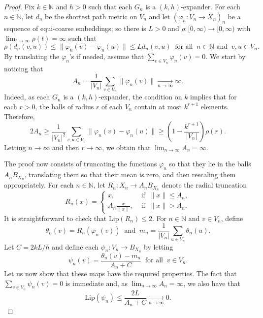 \documentclass[11pt]{amsart}
\newcommand{\N}{\mathbb{N}}
\newcommand{\Lip}{\mathrm{Lip}}
\theoremstyle{definition}
\theoremstyle{remark}
\begin{document}
\begin{proof} 
Fix $k\in\N$ and $h>0$ such that each $G_n$ is a $(k,h)$-expander. For each $n\in\N$, let $d_n$ be the shortest path metric on $V_n$ and let $(\varphi_n\colon V_n\to {X_n})_n$ be a sequence of equi-coarse embeddings; so there is $L>0$ and $\rho\colon [0,\infty)\to [0,\infty)$ with $\lim_{t\to \infty}\rho(t)=\infty$ such that 
\[\rho(d_n(v,u))\leq \|\varphi_n(v)-\varphi_n(u)\|\leq Ld_n(v,u) \ \text{ for all }\ n\in\N\text{ and }\ v,u\in V_n.\]
By translating the $\varphi_n$'s  if needed,  assume that $\sum_{v\in V_n}\varphi_n(v)=0$.
We start by noticing that 
\begin{equation}\label{Eq.Antoinfty}A_n=\frac{1}{|V_n|}\sum_{v\in V_n}\|\varphi_n(v)\|\underset{n\to \infty}{\longrightarrow} \infty.\end{equation}
Indeed, as each $G_n$ is a $(k,h)$-expander, the condition on $k$ implies that for each $r>0$, the balls of radius $r$ of each $V_n$ contain at most $k^{r+1}$ elements. Therefore, 
\[2A_n\geq \frac{1}{|V_n|^2} \sum_{v,u\in V_n}\|\varphi_n(v)-\varphi_n(u)\|\geq \left(1-\frac{k^{r+1}}{|V_n|}\right)\rho(r).\]
Letting $n\to \infty$ and then $r\to \infty$, we obtain that  $\lim_{n\to\infty}A_n=\infty$.


The proof now  consists of truncating the functions $\varphi_n$ so that they lie in the balls $A_nB_{X_n}$, translating them so that their mean is zero, and then rescaling them appropriately. For each $n\in\N$, let $R_n\colon X_n\to A_nB_{X_n}$ denote the radial truncation
\begin{equation*}
    R_n(x)=\left\{\begin{array}{cc}
      x   ,&  \text{ if }\ \|x\|\leq A_n,\\
       A_n\frac{x}{\|x\|},  & \text{ if }\ \|x\|>A_n. 
    \end{array}\right.
\end{equation*}
It is straightforward to check that $\Lip(R_n)\leq 2$. For $n\in\N$ and $v\in V_n$, define 
\[\theta_n(v)=R_n(\varphi_n(v))\ \text{ and }\ m_n=\frac{1}{|V_n|}\sum_{u\in V_n}\theta_n(u).\]
Let   $C=2kL/h$ and define each $\psi_n\colon V_n\to B_{X_n}$ by letting \[\psi_n(v)=\frac{\theta_n(v)-m_n}{A_n+C}\   \text{ for all } \ v\in V_n.\]
Let us now show that these maps have the required properties. The fact that $\sum_{v\in V_n}\psi_n(v)=0$ is immediate and, as $\lim_{n\to \infty}A_n=\infty$, we also have that 
\[\Lip(\psi_n)\leq \frac{2L}{A_n+C}\underset{n\to \infty}{\longrightarrow} 0.\]



\end{proof}
\end{document}
